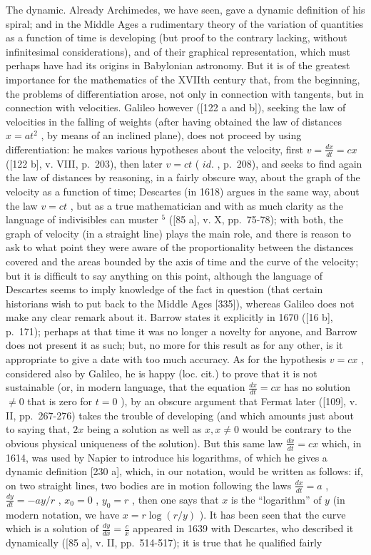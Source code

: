 \begin{enumerate}
  The dynamic. Already Archimedes, we have seen, gave a dynamic definition of his spiral; and in the Middle Ages a rudimentary theory of the variation of quantities as a function of time is developing (but proof to the contrary lacking, without infinitesimal considerations), and of their graphical representation, which must perhaps have had its origins in Babylonian astronomy. But it is of the greatest importance for the mathematics of the XVIIth century that, from the beginning, the problems of differentiation arose, not only in connection with tangents, but in connection with velocities. Galileo however ({[}122 a and b{]}), seeking the law of velocities in the falling of weights (after having obtained the law of distances \(x = at^2\) , by means of an inclined plane), does not proceed by using differentiation: he makes various hypotheses about the velocity, first \(v = \frac{dx}{dt} = cx\) ({[}122 b{]}, v. VIII, p.~203), then later \(v = ct\) ( \(id.\) , p.~208), and seeks to find again the law of distances by reasoning, in a fairly obscure way, about the graph of the velocity as a function of time; Descartes (in 1618) argues in the same way, about the law \(v = ct\) , but as a true mathematician and with as much clarity as the language of indivisibles can muster \(^{5}\) ({[}85 a{]}, v. X, pp.~75-78); with both, the graph of velocity (in a straight line) plays the main role, and there is reason to ask to what point they were aware of the proportionality between the distances covered and the areas bounded by the axis of time and the curve of the velocity; but it is difficult to say anything on this point, although the language of Descartes seems to imply knowledge of the fact in question (that certain historians wish to put back to the Middle Ages {[}335{]}), whereas Galileo does not make any clear remark about it. Barrow states it explicitly in 1670 ({[}16 b{]}, p.~171); perhaps at that time it was no longer a novelty for anyone, and Barrow does not present it as such; but, no more for this result as for any other, is it appropriate to give a date with too much accuracy. As for the hypothesis \(v = cx\) , considered also by Galileo, he is happy (loc. cit.) to prove that it is not sustainable (or, in modern language, that the equation \(\frac{dx}{dt} = cx\) has no solution \(\neq 0\) that is zero for \(t = 0\) ), by an obscure argument that Fermat later ({[}109{]}, v. II, pp.~267-276) takes the trouble of developing (and which amounts just about to saying that, \(2x\) being a solution as well as \(x, x \neq 0\) would be contrary to the obvious physical uniqueness of the solution). But this same law \(\frac{dx}{dt} = cx\) which, in 1614, was used by Napier to introduce his logarithms, of which he gives a dynamic definition {[}230 a{]}, which, in our notation, would be written as follows: if, on two straight lines, two bodies are in motion following the laws \(\frac{dx}{dt} = a\) , \(\frac{dy}{dt} = -ay/r\) , \(x_0 = 0\) , \(y_0 = r\) , then one says that \(x\) is the ``logarithm'' of \(y\) (in modern notation, we have \(x = r \log(r/y)\) ). It has been seen that the curve which is a solution of \(\frac{dy}{dx} = \frac{c}{x}\) appeared in 1639 with Descartes, who described it dynamically ({[}85 a{]}, v. II, pp.~514-517); it is true that he qualified fairly 
\end{enumerate}
